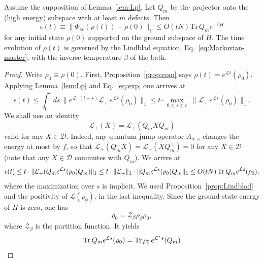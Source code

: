 \begin{lem}
\label{lem:memory-time}
Assume the supposition of Lemma~\ref{lem:Lp}.
Let $Q_m$ be the projector onto the (high energy) subspace with at least $m$ defects. Then
\begin{equation}
\label{eq:infidelity}
\epsilon(t)\equiv \| \Phi_{ec}(\rho(t))-\rho(0) \|_1 \le
O(tN) \mathrm{Tr} \, Q_m e^{-\beta H}
\end{equation}
for any initial state $\rho(0)$ supported on the ground subspace of $H$.
The time evolution of $\rho(t)$ is governed by the Lindblad equation, Eq.~\eqref{eq:Markovian-master},
with the inverse temperature $\beta$ of the bath.
\end{lem}
\begin{proof}
Write $\rho_0 \equiv \rho(0)$.
First, Proposition~\ref{prop:com} says $\rho(t) = e^{\mathcal L t} (\rho_0)$.
Applying Lemma~\ref{lem:Lp} and Eq.~\eqref{eq:exp} one arrives at
\begin{equation}
\epsilon(t)\le \int_0^t ds\, \| e^{\mathcal L_-(t-s)}  \mathcal L_+ \, e^{\mathcal L s} (\rho_0) \|_1
\le t \cdot \max_{0\le s\le t} \; \|  \mathcal L_+ \, e^{\mathcal L s} (\rho_0) \|_1.
\end{equation}
We shall use an identity
\begin{equation}
\mathcal L_+(X)=\mathcal L_+( Q_m X Q_m)
\end{equation}
valid for any $X \in \mathcal D$. Indeed,
any quantum jump operator $A_{\alpha,\omega}$ changes the energy at most by $f$,
so that $\mathcal L_+(Q_m^\perp X)=\mathcal L_+(XQ_m^\perp)=0$  for any $ X \in \mathcal D$ (note that any $ X \in \mathcal D$
commutes with $Q_m$).
We arrive at
\begin{equation}
\epsilon(t)
\le t \cdot \| \mathcal L_+(Q_m e^{\mathcal L s} (\rho_0) Q_m) \|_1
\le t \cdot \| \mathcal L_+ \|_1 \cdot \| Q_m e^{\mathcal L s} (\rho_0)  Q_m \|_1
\le O(tN) \mathop{\mathrm{Tr}}\nolimits{ Q_m  e^{\mathcal L s} (\rho_0)},
\label{epsilon_bound}
\end{equation}
where the maximization over $s$ is implicit.
We used Proposition~\ref{prop:Lindblad} and the positivity of $\mathcal L(\rho_0)$.
in the last inequality.
Since the ground-state energy of $H$ is zero, one has
\begin{equation}
\rho_0 = \mathcal Z_\beta \rho_\beta \rho_0,
\end{equation}
where $\mathcal Z_\beta$ is the partition function. It yields
\begin{equation}
\trace{ Q_m  e^{\mathcal L s} (\rho_0)}
= \trace{  \rho_0 \, e^{\mathcal L^* s}(Q_m)}

\end{equation}
\end{proof}
